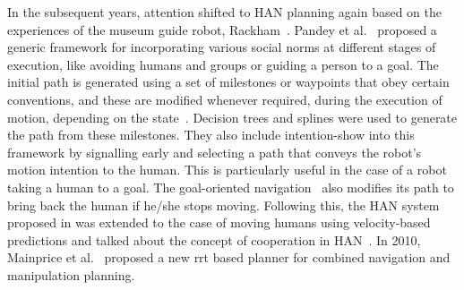 In the subsequent years, attention shifted to HAN planning again based on the experiences of the museum guide robot, Rackham~\cite{clodic_rackham_2006}. Pandey et al.~\cite{pandey2009framework, pandey2009step} proposed a generic framework for incorporating various social norms at different stages of execution, like avoiding humans and groups or guiding a person to a goal. The initial path is generated using a set of milestones or waypoints that obey certain conventions, and these are modified whenever required, during the execution of motion, depending on the state~\cite{pandey_framework_2010}.  Decision trees and splines were used to generate the path from these milestones. They also include intention-show into this framework by signalling early and selecting a path that conveys the robot's motion intention to the human. This is particularly useful in the case of a robot taking a human to a goal. The goal-oriented navigation~\cite{pandey2009step} also modifies its path to bring back the human if he/she stops moving. Following this, the HAN system proposed in \cite{sisbot_navigation_2005} was extended to the case of moving humans using velocity-based predictions and talked about the concept of cooperation in HAN~\cite{kruse2010dynamic, kruse2010exploiting}. In 2010, Mainprice et al.~\cite{mainprice2010planning} proposed a new \acrshort{rrt} based planner for combined navigation and manipulation planning.

